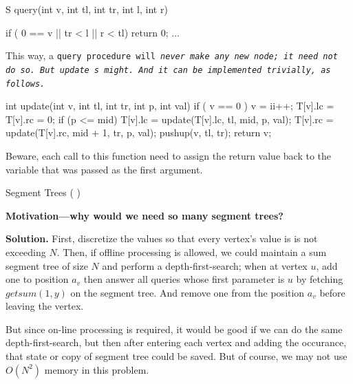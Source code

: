 \begtt
S query(int v, int tl, int tr, int l, int r) {
if ( 0 == v || tr < l || r < tl)   return 0;
...\endtt

This way, a \tt query \rm procedure will \it never \rm make any new node; it need not do so.  But \tt update \rm s might.  And it can be implemented trivially, as follows.

\begtt
int update(int v, int tl, int tr, int p, int val) {
    if ( v == 0 ) {
        v = ii++;
        T[v].lc  =  T[v].rc  =  0;
      }
    if (p <= mid) {
        T[v].lc = update(T[v].lc, tl, mid, p, val);
        T[v].rc = update(T[v].rc, mid + 1, tr, p, val);
      }
    pushup(v, tl, tr);
    return v;
  }
\endtt

Beware, each call to this function need to assign the return value back to the variable that was passed as the first argument.




\secc {} Segment Trees ( )

{\bf Motivation---why would we need so many segment trees?}


{\bf Solution.}  First, discretize the values so that every vertex's value is is not exceeding $N$. Then,
if offline processing is allowed, we could maintain a sum segment tree of size $N$ and perform a depth-first-search;
when at vertex $u$, add one to position $a_v$ then answer all queries whose first parameter is $u$ by fetching
$getsum(1, y)$ on the segment tree.  And remove one from the position $a_v$ before leaving the vertex.

But since on-line processing is required, it would be good if we can do the same depth-first-search, but then
after entering each vertex and adding the occurance, that state or copy of segment tree could be saved.
But of course, we may not use $O(N^2)$ memory in this problem.

}
